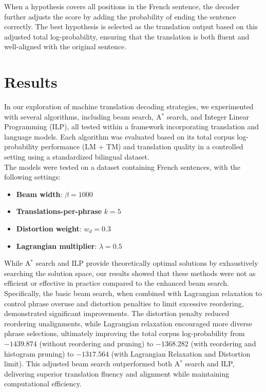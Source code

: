 \documentclass{article}
\begin{document}
When a hypothesis covers all positions in the French sentence, the decoder further adjusts the score by adding the probability of ending the sentence correctly. The best hypothesis is selected as the translation output based on this adjusted total log-probability, ensuring that the translation is both fluent and well-aligned with the original sentence.

\section{Results}
In our exploration of machine translation decoding strategies, we experimented with several algorithms, including beam search, A\(^*\) search, and Integer Linear Programming (ILP), all tested within a framework incorporating translation and language models. Each algorithm was evaluated based on its total corpus log-probability performance (LM + TM) and translation quality in a controlled setting using a standardized bilingual dataset. \\ 


The models were tested on a dataset containing French sentences, with the following settings:
\begin{itemize}
    \item \textbf{Beam width}: \( \beta = 1000 \)
    \item \textbf{Translations-per-phrase} \( k = 5 \)
    \item \textbf{Distortion weight}: \( w_d = 0.3 \)
    \item \textbf{Lagrangian multiplier}: \( \lambda = 0.5 \)
\end{itemize}

While A\(^*\) search and ILP provide theoretically optimal solutions by exhaustively searching the solution space, our results showed that these methods were not as efficient or effective in practice compared to the enhanced beam search. Specifically, the basic beam search, when combined with Lagrangian relaxation to control phrase overuse and distortion penalties to limit excessive reordering, demonstrated significant improvements. The distortion penalty reduced reordering unalignments, while Lagrangian relaxation encouraged more diverse phrase selections, ultimately improving the total corpus log-probability from \(-1439.874\) (without reordering and pruning) to \(-1368.282\) (with reordering and histogram pruning) to \(-1317.564\) (with Lagrangian Relaxation and Distortion limit). This adjusted beam search outperformed both A\(^*\) search and ILP, delivering superior translation fluency and alignment while maintaining computational efficiency.
\end{document}
